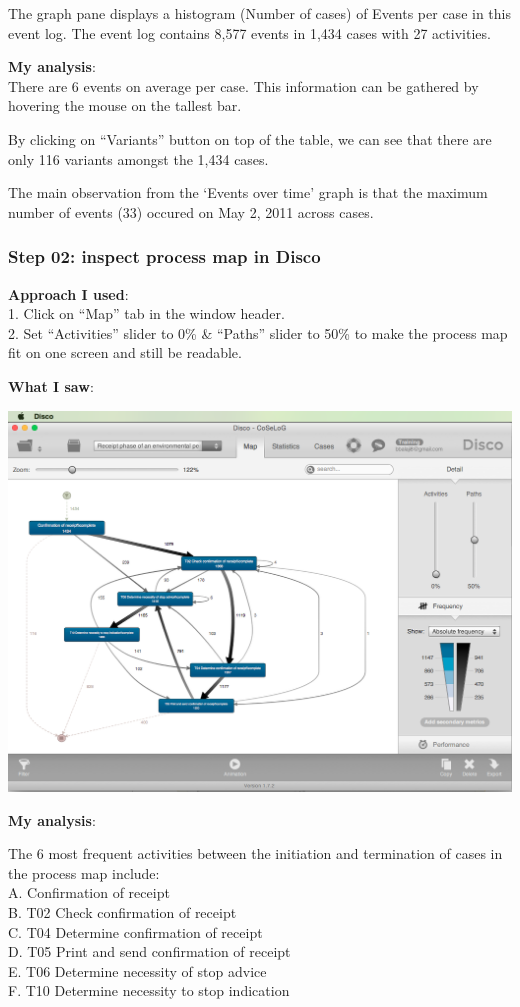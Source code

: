 \documentclass[]{article}
\begin{document}
The graph pane displays a histogram (Number of cases) of Events per case
in this event log. The event log contains 8,577 events in 1,434 cases
with 27 activities.

\textbf{My analysis}:\\There are 6 events on average per case. This
information can be gathered by hovering the mouse on the tallest bar.

By clicking on ``Variants'' button on top of the table, we can see that
there are only 116 variants amongst the 1,434 cases.

The main observation from the `Events over time' graph is that the
maximum number of events (33) occured on May 2, 2011 across cases.

\subsubsection{Step 02: inspect process map in
Disco}\label{step-02-inspect-process-map-in-disco}

\textbf{Approach I used}:\\1. Click on ``Map'' tab in the window
header.\\2. Set ``Activities'' slider to 0\% \& ``Paths'' slider to 50\%
to make the process map fit on one screen and still be readable.

\textbf{What I saw}:

\includegraphics{CoSeLoG_Step_02.png}

\textbf{My analysis}:

The 6 most frequent activities between the initiation and termination of
cases in the process map include:\\A. Confirmation of receipt\\B. T02
Check confirmation of receipt\\C. T04 Determine confirmation of
receipt\\D. T05 Print and send confirmation of receipt\\E. T06 Determine
necessity of stop advice\\F. T10 Determine necessity to stop indication
\end{document}
